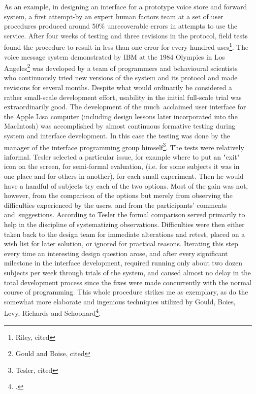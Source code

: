 As an example, in designing an interface for a prototype voice store and forward system, a first attempt-by an expert human factors team at a set of user procedures produced around 50\% unrecoverable errors in attempts to use the service. After four weeks of testing and three revisions in the protocol, field tests found the procedure to result in less than one error for every hundred uses\footnote{Riley, cited\cite{Cox2008}}. The voice message system demonstrated by IBM at the 1984 Olympics in Los Angeles\footnote{Gould and Boise, cited\cite{Cox2008}} was developed by a team of programmers and behavioural scientists who continuously tried new versions of the system and its protocol and made revisions for several months. Despite what would ordinarily be considered a rather small-scale development effort, usability in the initial full-scale trial was extraordinarily good. The development of the much acclaimed user interface for the Apple Lisa computer (including design lessons later incorporated into the MacIntosh) was accomplished by almost continuous formative testing during system and interface development. In this case the testing was done by the manager of the interface programming group himself\footnote{Tesler, cited\cite{Cox2008}}. The tests were relatively informal. Tesler selected a particular issue, for example where to put an "exit" icon on the screen, for semi-formal evaluation, (i.e. for some subjects it was in one place and for others in another), for each small experiment. Then he would have a handful of subjects try each of the two options. Most of the gain was not, however, from the comparison of the options but merely from observing the difficulties experienced by the users, and from the participants' comments and suggestions. According to Tesler the formal comparison served primarily to help in the discipline of systematizing observations. Difficulties were then either taken back to the design team for immediate alterations and retest, placed on a wish list for later solution, or ignored for practical reasons. Iterating this step every time an interesting design question arose, and after every significant milestone in the interface development, required running only about two dozen subjects per week through trials of the system, and caused almost no delay in the total development process since the fixes were made concurrently with the normal course of programming. This whole procedure strikes me as exemplary, as do the somewhat more elaborate and ingenious techniques utilized by Gould, Boies, Levy, Richards and Schoonard\footcite{Cox2008}.

